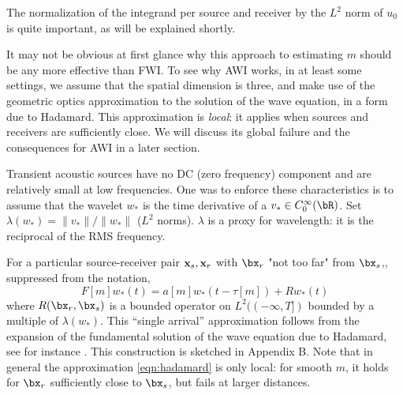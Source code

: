 The normalization of the integrand per source and receiver by the $L^2$ norm of $u_0$ is quite important, as will be explained shortly.

It may not be obvious at first glance why this approach to estimating $m$ should be any more effective than FWI. To see why AWI works, in at least some settings, we assume that the spatial dimension is three, and make use of the geometric optics approximation to the solution of the wave equation, in a form due to Hadamard. This approximation is {\em local}: it applies when sources and receivers are sufficiently close. We will discuss its global failure and the consequences for AWI in a later section.

Transient acoustic sources have no DC (zero frequency) component and are relatively small at low frequencies. One was to enforce these characteristics is to assume that the wavelet $w_*$ is the time derivative of a $v_* \in C_0^{\infty}(\bR)$. Set $\lambda(w_*) = \|v_*\|/\|w_*\|$ ($L^2$ norms). $\lambda$ is a proxy for wavelength: it is the reciprocal of the RMS frequency.

For a particular source-receiver pair ${\bf x}_s,{\bf x}_r$ with $\bx_r$ "not too far" from $\bx_s$,, suppressed from the notation,
\begin{equation}
  \label{eqn:hadamard}
  F[m]w_*(t) = a[m]w_*(t-\tau[m]) + Rw_*(t)
\end{equation}
where $R(\bx_r,\bx_s)$ is a bounded operator on $L^2((-\infty,T])$ bounded by a multiple of $\lambda(w_*)$. This ``single arrival'' approximation  follows from the expansion of the fundamental solution of the wave equation due to Hadamard, see for instance \cite{Friedlander:75}. This construction is sketched in Appendix B. Note that in general the approximation \ref{eqn:hadamard} is only local: for smooth $m$, it holds for $\bx_r$ sufficiently close to $\bx_s$, but fails at larger distances.

